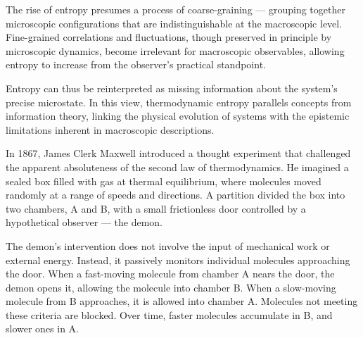 The rise of entropy presumes a process of coarse-graining — grouping together microscopic configurations that are indistinguishable at the macroscopic level. Fine-grained correlations and fluctuations, though preserved in principle by microscopic dynamics, become irrelevant for macroscopic observables, allowing entropy to increase from the observer's practical standpoint.

Entropy can thus be reinterpreted as missing information about the system's precise microstate. In this view, thermodynamic entropy parallels concepts from information theory, linking the physical evolution of systems with the epistemic limitations inherent in macroscopic descriptions.

In 1867, James Clerk Maxwell introduced a thought experiment that challenged the apparent absoluteness of the second law of thermodynamics. He imagined a sealed box filled with gas at thermal equilibrium, where molecules moved randomly at a range of speeds and directions. A partition divided the box into two chambers, A and B, with a small frictionless door controlled by a hypothetical observer — the demon.

The demon's intervention does not involve the input of mechanical work or external energy. Instead, it passively monitors individual molecules approaching the door. When a fast-moving molecule from chamber A nears the door, the demon opens it, allowing the molecule into chamber B. When a slow-moving molecule from B approaches, it is allowed into chamber A. Molecules not meeting these criteria are blocked. Over time, faster molecules accumulate in B, and slower ones in A.

